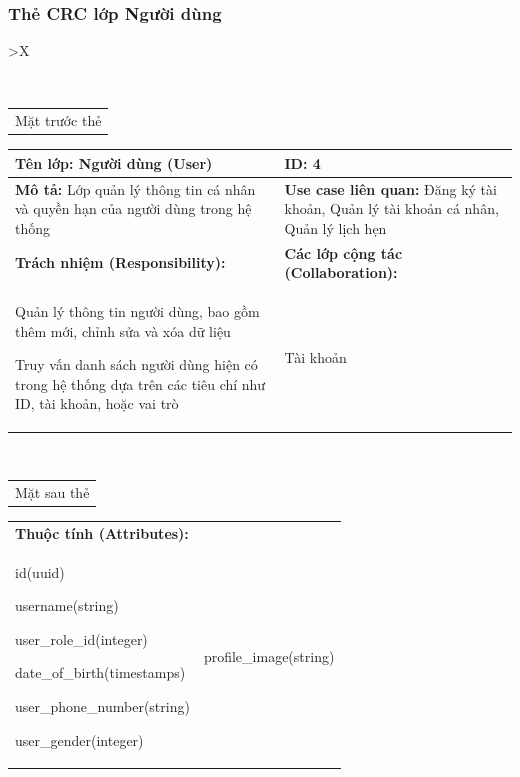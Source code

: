 \subsubsection{Thẻ CRC lớp Người dùng}

\begin{xltabular}{\textwidth}{
		>{\centering\arraybackslash}X
	}
	\caption{\bfseries \fontsize{12pt}{0pt}\selectfont Thẻ CRC lớp Người dùng}
	\\
	\begin{tabularx}{0.9\textwidth}{X}
		Mặt trước thẻ
	\end{tabularx}
	\begin{tabularx}{0.9\textwidth}{|X|X|}
		\hline
		\textbf{Tên lớp:} Người dùng (User)                                                      & \textbf{ID:} 4                                                                               \\
		\hline
		\textbf{Mô tả:} Lớp quản lý thông tin cá nhân và quyền hạn của người dùng trong hệ thống & \textbf{Use case liên quan:}  Đăng ký tài khoản, Quản lý tài khoản cá nhân, Quản lý lịch hẹn \\
		\hline
		\textbf{Trách nhiệm (Responsibility):}                                                   & \textbf{Các lớp cộng tác (Collaboration):}                                                   \\
		Quản lý thông tin người dùng, bao gồm thêm mới, chỉnh sửa và xóa dữ liệu

		Truy vấn danh sách người dùng hiện có trong hệ thống dựa trên các tiêu chí như ID, tài khoản, hoặc vai trò
		                                                                                         &
		Tài khoản
		\\
		\hline
	\end{tabularx}
	\\
	\begin{tabularx}{0.9\textwidth}{X}
		Mặt sau thẻ
	\end{tabularx}
	\begin{tabularx}{0.9\textwidth}{|X|X|}
		\hline
		\textbf{Thuộc tính (Attributes):} & \\
		id(uuid)

		username(string)

		user\_role\_id(integer)

		date\_of\_birth(timestamps)

		user\_phone\_number(string)

		user\_gender(integer)
		                                  &
		profile\_image(string)


\end{tabularx}
\end{xltabular}
